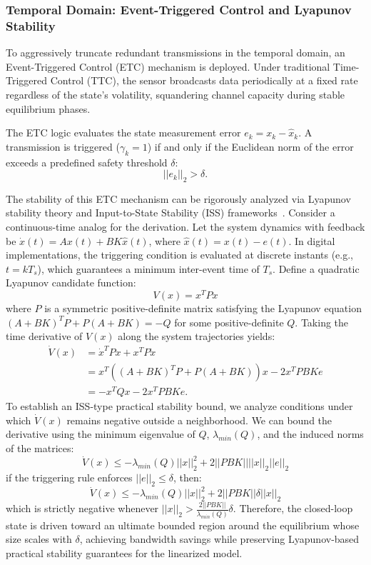 \subsubsection{Temporal Domain: Event-Triggered Control and Lyapunov Stability}
To aggressively truncate redundant transmissions in the temporal domain, an Event-Triggered Control (ETC) mechanism is deployed. Under traditional Time-Triggered Control (TTC), the sensor broadcasts data periodically at a fixed rate regardless of the state's volatility, squandering channel capacity during stable equilibrium phases.

The ETC logic evaluates the state measurement error $e_k = x_k - \hat{x}_k$. A transmission is triggered ($\gamma_k = 1$) if and only if the Euclidean norm of the error exceeds a predefined safety threshold $\delta$:
\begin{equation}
    ||e_k||_2 > \delta.
\end{equation}

The stability of this ETC mechanism can be rigorously analyzed via Lyapunov stability theory and Input-to-State Stability (ISS) frameworks~\cite{AIETSC,DTMEC}. Consider a continuous-time analog for the derivation. Let the system dynamics with feedback be $\dot{x}(t) = A x(t) + B K \hat{x}(t)$, where $\hat{x}(t) = x(t) - e(t)$. In digital implementations, the triggering condition is evaluated at discrete instants (e.g., $t=kT_s$), which guarantees a minimum inter-event time of $T_s$.
Define a quadratic Lyapunov candidate function:
\begin{equation}
    V(x) = x^T P x
\end{equation}
where $P$ is a symmetric positive-definite matrix satisfying the Lyapunov equation $(A+BK)^T P + P(A+BK) = -Q$ for some positive-definite $Q$. 
Taking the time derivative of $V(x)$ along the system trajectories yields:
\begin{align}
    \dot{V}(x) &= \dot{x}^T P x + x^T P \dot{x} \\
               &= x^T ((A+BK)^T P + P(A+BK)) x - 2 x^T P B K e \\
               &= -x^T Q x - 2 x^T P B K e.
\end{align}
To establish an ISS-type practical stability bound, we analyze conditions under which $\dot{V}(x)$ remains negative outside a neighborhood. We can bound the derivative using the minimum eigenvalue of $Q$, $\lambda_{min}(Q)$, and the induced norms of the matrices:
\begin{equation}
    \dot{V}(x) \le -\lambda_{min}(Q) ||x||_2^2 + 2 ||P B K|| ||x||_2 ||e||_2
\end{equation}
if the triggering rule enforces $||e||_2 \le \delta$, then:
\begin{equation}
    \dot{V}(x) \le -\lambda_{min}(Q) ||x||_2^2 + 2 ||P B K|| \delta ||x||_2
\end{equation}
which is strictly negative whenever $||x||_2 > \frac{2||P B K||}{\lambda_{min}(Q)} \delta$. Therefore, the closed-loop state is driven toward an ultimate bounded region around the equilibrium whose size scales with $\delta$, achieving bandwidth savings while preserving Lyapunov-based practical stability guarantees for the linearized model.

